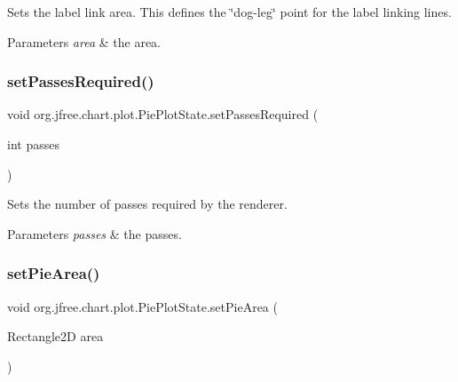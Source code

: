 Sets the label link area. This defines the \char`\"{}dog-\/leg\char`\"{} point for the label linking lines.


\begin{DoxyParams}{Parameters}
{\em area} & the area. \\
\hline
\end{DoxyParams}
\mbox{\label{classorg_1_1jfree_1_1chart_1_1plot_1_1_pie_plot_state_a4cf861bf64d679022c2853f6909af1ad}} 
\subsubsection{\texorpdfstring{set\+Passes\+Required()}{setPassesRequired()}}
{\footnotesize\ttfamily void org.\+jfree.\+chart.\+plot.\+Pie\+Plot\+State.\+set\+Passes\+Required (\begin{DoxyParamCaption}\item[{int}]{passes }\end{DoxyParamCaption})}

Sets the number of passes required by the renderer.


\begin{DoxyParams}{Parameters}
{\em passes} & the passes. \\
\hline
\end{DoxyParams}
\mbox{\label{classorg_1_1jfree_1_1chart_1_1plot_1_1_pie_plot_state_ae1f368310b1984da5c0d84eeb7d2fad4}} 
\subsubsection{\texorpdfstring{set\+Pie\+Area()}{setPieArea()}}
{\footnotesize\ttfamily void org.\+jfree.\+chart.\+plot.\+Pie\+Plot\+State.\+set\+Pie\+Area (\begin{DoxyParamCaption}\item[{Rectangle2D}]{area }\end{DoxyParamCaption})}

